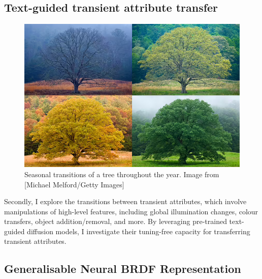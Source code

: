 
\subsection{Text-guided transient attribute transfer} 

\begin{figure}[ht]
  \centering

    \includegraphics[width=\linewidth]{Images/seasonchanges.png}

   \caption{Seasonal transitions of a tree throughout the year. Image from [Michael Melford/Getty Images]}
   \label{fig:colour-approximate}
\end{figure}

Secondly, I explore the transitions between transient attributes, which involve manipulations of high-level features, including global illumination changes, colour transfers, object addition/removal, and more. By leveraging pre-trained text-guided diffusion models, I investigate their tuning-free capacity for transferring transient attributes.

\subsection{Generalisable Neural BRDF Representation}

